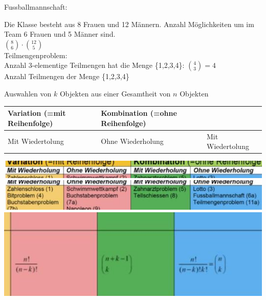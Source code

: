 \documentclass[10pt]{article}
\begin{document}
Fussballmannschaft:

Die Klasse besteht aus 8 Frauen und 12 Männern. Anzahl Möglichkeiten um im Team 6 Frauen und 5 Männer sind.\\
$\binom{8}{6} \cdot\binom{12}{5}$\\
Teilmengenproblem:\\
Anzahl 3-elementige Teilmengen hat die Menge \{1,2,3,4\}: $\binom{4}{3}=4$\\
Anzahl Teilmengen der Menge \{1,2,3,4\}

Auswahlen von $k$ Objekten aus einer Gesamtheit von $n$ Objekten \begin{tabular}{lll}
Variation (=mit Reihenfolge) & Kombination (=ohne Reihenfolge) &  \\
\hline
Mit Wiedertolung & Ohne Wiederholung & Mit Wiedertolung \\
\hline
\end{tabular}

\includegraphics[max width=\textwidth, center]{2024_12_29_0906b02acf849bda8665g-3(3)}\\
\includegraphics[max width=\textwidth, center]{2024_12_29_0906b02acf849bda8665g-3(15)}\\
\includegraphics[max width=\textwidth, center]{2024_12_29_0906b02acf849bda8665g-3(7)}
\end{document}
